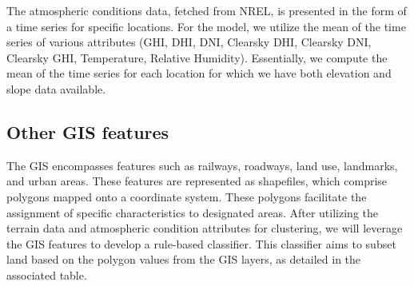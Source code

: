 \documentclass[a4paper,12pt]{Classes/RoboticsLaTeX}
\begin{document}
	The atmospheric conditions data, fetched from \ac{NREL}, is presented in the form of a time series for specific locations. For the model, 
	we utilize the mean of the time series of various attributes (GHI, DHI, DNI, Clearsky DHI, Clearsky DNI, Clearsky GHI, Temperature, Relative Humidity). 
	Essentially, we compute the mean of the time series for each location for which we have both elevation and slope data available.


	\subsection{Other \ac{GIS} features}
	
	The \ac{GIS} encompasses features such as railways, roadways, land use, landmarks, and urban areas. These features are represented as shapefiles, which comprise polygons 
	mapped onto a coordinate system. These polygons facilitate the assignment of specific characteristics to designated areas. After utilizing the terrain data and atmospheric 
	condition attributes for clustering, we will leverage the \ac{GIS} features to develop a rule-based classifier. This classifier aims to subset land based on the polygon values 
	from the \ac{GIS} layers, as detailed in the associated table.
\end{document}
